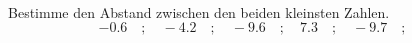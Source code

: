 \begin{aufgabe} ~ \\ 
Bestimme den Abstand zwischen den beiden kleinsten Zahlen.\[-0.6\quad ; \quad-4.2\quad ; \quad-9.6\quad ; \quad7.3\quad ; \quad-9.7\quad ; \quad\]\underline{\hspace{12cm}}\end{aufgabe} 

